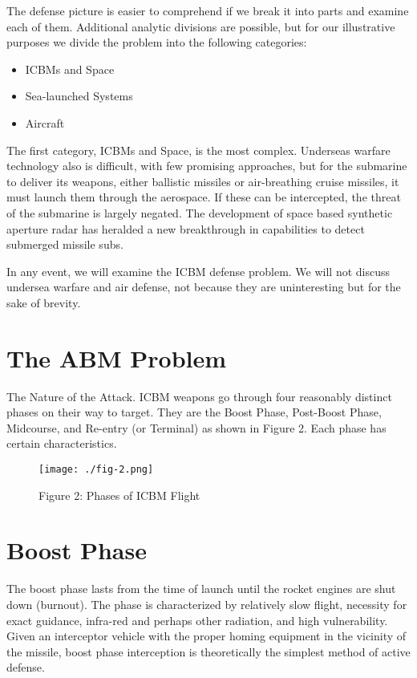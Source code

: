 The defense picture is easier to comprehend if we break it into parts and examine each of them. Additional analytic divisions are possible, but for our illustrative purposes we divide the problem into the following categories:
\begin{itemize}
    \item ICBMs and Space
    \item Sea-launched Systems
    \item Aircraft
\end{itemize}

The first category, ICBMs and Space, is the most complex. Underseas warfare technology also is difficult, with few promising approaches, but for the submarine to deliver its weapons, either ballistic missiles or air-breathing cruise missiles, it must launch them through the aerospace. If these can be intercepted, the threat of the submarine is largely negated. The development of space based synthetic aperture radar has heralded a new breakthrough in capabilities to detect submerged missile subs.

In any event, we will examine the ICBM defense problem. We will not discuss undersea warfare and air defense, not because they are uninteresting but for the sake of brevity.

\section{The ABM Problem}
The Nature of the Attack. ICBM weapons go through four reasonably distinct phases on their way to target. They are the Boost Phase, Post-Boost Phase, Midcourse, and Re-entry (or Terminal) as shown in Figure 2. Each phase has certain characteristics.

\begin{figure}
    \centering
    \texttt{[image: ./fig-2.png]}
    \caption{Figure 2: Phases of ICBM Flight}
    \label{fig:icbm-traj}
\end{figure}

\section{Boost Phase}
The boost phase lasts from the time of launch until the rocket engines are shut down (burnout). The phase is characterized by relatively slow flight, necessity for exact guidance, infra-red and perhaps other radiation, and high vulnerability. Given an interceptor vehicle with the proper homing equipment in the vicinity of the missile, boost phase interception is theoretically the simplest method of active defense.

